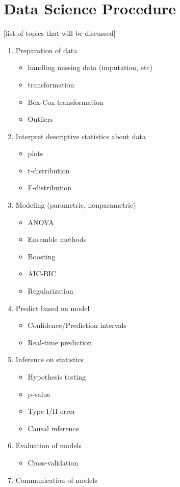 \documentclass[11pt,reqno]{amsart}
\theoremstyle{remark}
\begin{document}
\section{Data Science Procedure}[list of topics that will be discussed]
\begin{enumerate}
\item Preparation of data
\begin{itemize}
\item handling missing data (imputation, etc)
\item transformation
\item Box-Cox transformation
\item Outliers
\end{itemize}

\item Interpret descriptive statistics about data
\begin{itemize}
\item plots
\item t-distribution
\item F-distribution
\end{itemize}

\item Modeling (parametric, nonparametric)
\begin{itemize}
\item ANOVA
\item Ensemble methods
\item Boosting
\item AIC-BIC
\item Regularization
\end{itemize}

\item Predict based on model
\begin{itemize}
\item Confidence/Prediction intervals
\item Real-time prediction
\end{itemize}

\item Inference on statistics
\begin{itemize}
\item Hypothesis testing
\item p-value
\item Type I/II error
\item Causal inference
\end{itemize}

\item Evaluation of models
\begin{itemize}
\item Cross-validation
\end{itemize}

\item Communication of models
\end{enumerate}
\end{document}
